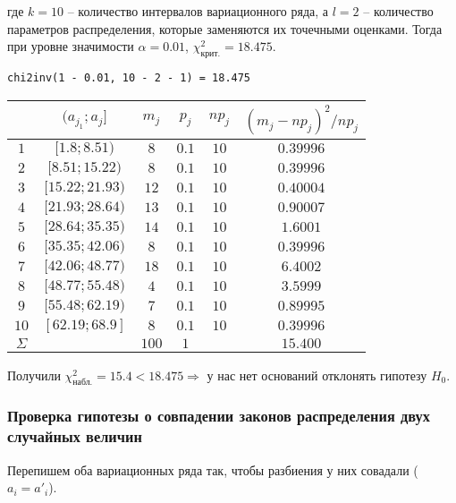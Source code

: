 \documentclass{report}
\begin{document}
где $k = 10$ -- количество интервалов вариационного ряда, а $l = 2$ -- количество параметров распределения, которые заменяются их точечными оценками. Тогда при уровне значимости $\alpha = 0.01$, $\chi^2_\text{крит.} = 18.475$.

\begin{lstlisting}
chi2inv(1 - 0.01, 10 - 2 - 1) = 18.475
\end{lstlisting}

\begin{table}[h]
\begin{tabularx}{\textwidth}{|c|c|c|c|c|c|}
\hline
      & $( a_{j_1}; a_j]$ & $m_j$ & $p_j$  & $np_j$ & $(m_j - np_j)^2 / np_j$ \\
\hline 
    $1$ & $[1.8  ;8.51 )$ & $8$   & $0.1$  & $10$   & $0.39996$ \\
    $2$ & $[8.51 ;15.22)$ & $8$   & $0.1$  & $10$   & $0.39996$ \\
    $3$ & $[15.22;21.93)$ & $12$  & $0.1$  & $10$   & $0.40004$ \\
    $4$ & $[21.93;28.64)$ & $13$  & $0.1$  & $10$   & $0.90007$ \\
    $5$ & $[28.64;35.35)$ & $14$  & $0.1$  & $10$   & $1.6001 $ \\
    $6$ & $[35.35;42.06)$ & $8$   & $0.1$  & $10$   & $0.39996$ \\
    $7$ & $[42.06;48.77)$ & $18$  & $0.1$  & $10$   & $6.4002$ \\
    $8$ & $[48.77;55.48)$ & $4$   & $0.1$  & $10$   & $3.5999$ \\
    $9$ & $[55.48;62.19)$ & $7$   & $0.1$  & $10$   & $0.89995$ \\
    $10$& $[62.19;68.9 ]$ & $8$   & $0.1$  & $10$   & $0.39996$ \\
$\Sigma$&                 & $100$ & $1$    &        & $15.400$ \\
\hline
\end{tabularx}
\end{table}

Получили $\chi^2_\text{набл.} = 15.4 < 18.475 \Rightarrow$ у нас нет оснований отклонять гипотезу $H_0$.

\newpage

\subsubsection*{Проверка гипотезы о совпадении законов распределения двух случайных величин}

Перепишем оба вариационных ряда так, чтобы разбиения у них совадали ($a_i = a'_i$).
\end{document}
